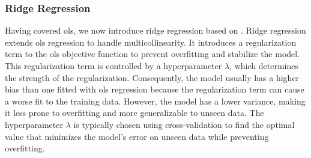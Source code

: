 \subsubsection{Ridge Regression}
Having covered \gls{ols}, we now introduce ridge regression based on \citet{James2023AnIS}.
Ridge regression extends \gls{ols} regression to handle multicollinearity.
It introduces a regularization term to the \gls{ols} objective function to prevent overfitting and stabilize the model.
This regularization term is controlled by a hyperparameter $\lambda$, which determines the strength of the regularization. Consequently, the model usually has a higher bias than one fitted with \gls{ols} regression because the regularization term can cause a worse fit to the training data.
However, the model has a lower variance, making it less prone to overfitting and more generalizable to unseen data.
The hyperparameter $\lambda$ is typically chosen using cross-validation to find the optimal value that minimizes the model's error on unseen data while preventing overfitting.
